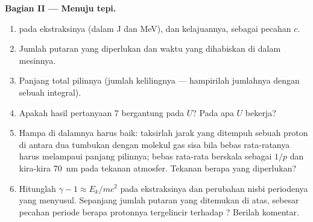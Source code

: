 \begin{problem}
\medskip
\noindent\textbf{Bagian II --- Menuju tepi.}
\begin{enumerate}[resume]
  \item {} pada ekstraksinya (dalam J dan MeV), dan kelajuannya,
        sebagai pecahan $c$.
  \item Jumlah putaran yang diperlukan dan waktu yang dihabiskan di dalam mesinnya.
  \item Panjang total  pilinnya (jumlah kelilingnya ---
        hampirilah jumlahnya dengan sebuah integral).
  \item Apakah hasil pertanyaan 7 bergantung pada $U$? Pada apa $U$
        bekerja?
  \item Hampa di dalamnya harus baik: taksirlah jarak yang ditempuh sebuah
        proton di antara dua tumbukan dengan molekul gas sisa bila 
        bebas rata-ratanya harus melampaui panjang pilinnya;  bebas
        rata-rata berskala sebagai $1/p$ dan kira-kira \qty{70}{nm} pada tekanan
        atmosfer. Tekanan berapa yang diperlukan?
  \item Hitunglah $\gamma - 1 \approx E_k/mc^2$ pada ekstraksinya dan
        perubahan nisbi periodenya yang menyusul. Sepanjang jumlah putaran
        yang ditemukan di atas, sebesar pecahan periode berapa protonnya
        tergelincir terhadap ? Berilah komentar.
\end{enumerate}


\end{problem}
